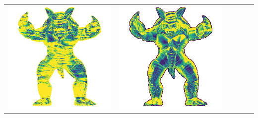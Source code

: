 \begin{center}
\begin{tabularx}{\linewidth}{@{}Y@{}Y@{}Y@{}Y@{}Y@{}Y@{}}
\includegraphics[width=\linewidth]{semisynthetic/20150514_22_yu_err.png} &
\includegraphics[width=\linewidth]{semisynthetic/20150514_22_dpsn_err.png} &

\end{tabularx}
\end{center}

